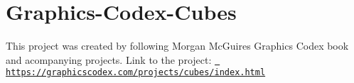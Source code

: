 \chapter{Graphics-\/\+Codex-\/\+Cubes}
\hypertarget{md__r_e_a_d_m_e}{}\label{md__r_e_a_d_m_e}
\label{md__r_e_a_d_m_e_autotoc_md0}%
%


This project was created by following Morgan Mc\+Guire\textquotesingle{}s Graphics Codex book and acompanying projects. Link to the project\+: \href{https://graphicscodex.com/projects/cubes/index.html}{\texttt{ https\+://graphicscodex.\+com/projects/cubes/index.\+html}} 